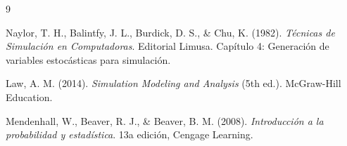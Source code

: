 \documentclass{article}
\begin{document}
\vspace{0.6cm}

\begin{thebibliography}{9}

Naylor, T. H., Balintfy, J. L., Burdick, D. S., \& Chu, K. (1982).
\textit{Técnicas de Simulación en Computadoras}. 
Editorial Limusa. Capítulo 4: Generación de variables estocásticas para simulación.

Law, A. M. (2014).
\textit{Simulation Modeling and Analysis} (5th ed.).
McGraw-Hill Education.

Mendenhall, W., Beaver, R. J., \& Beaver, B. M. (2008).
\textit{Introducción a la probabilidad y estadística}.
13a edición, Cengage Learning.


\end{thebibliography}
\end{document}
